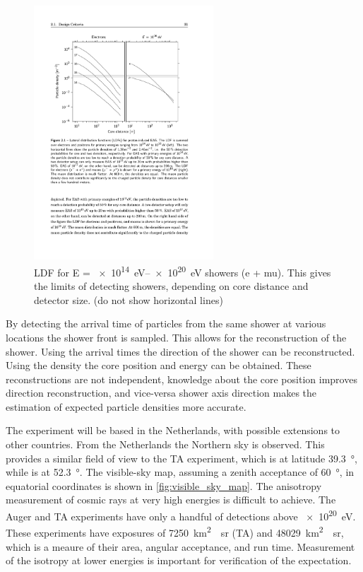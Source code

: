\begin{figure}
    \centering
    \includegraphics[width=0.6\textwidth]
                    {plots/experiment/ldf_energies}
    \caption{LDF for E = \SIrange{e14}{e20}{\eV} showers (e + mu). This gives the limits of detecting showers, depending on core distance and detector size. (do not show horizontal lines)}
    \label{fig:ldf_energies}
\end{figure}

By detecting the arrival time of particles from the same shower at various locations the shower front is sampled. This allows for the reconstruction of the shower. Using the arrival times the direction of the shower can be reconstructed. Using the density the core position and energy can be obtained. These reconstructions are not independent, knowledge about the core position improves direction reconstruction, and vice-versa shower axis direction makes the estimation of expected particle densities more accurate.

The experiment will be based in the Netherlands, with possible extensions to other countries. From the Netherlands the Northern sky is observed. This provides a similar field of view to the TA experiment, which is at latitude \SI{39.3}{\degree}, while \nikhef is at \SI{52.3}{\degree}. The visible-sky map, assuming a zenith acceptance of \SI{60}{\degree}, in equatorial coordinates is shown in \cref{fig:visible_sky_map}. The anisotropy measurement of cosmic rays at very high energies is difficult to achieve. The Auger and TA experiments have only a handful of detections above \SI{e20}{\eV}. These experiments have exposures of \SI{7250}{\kilo\meter\squared\year\steradian} (TA) and \SI{48029}{\kilo\meter\squared\year\steradian}, which is a meaure of their area, angular acceptance, and run time. Measurement of the isotropy at lower energies is important for verification of the expectation.

